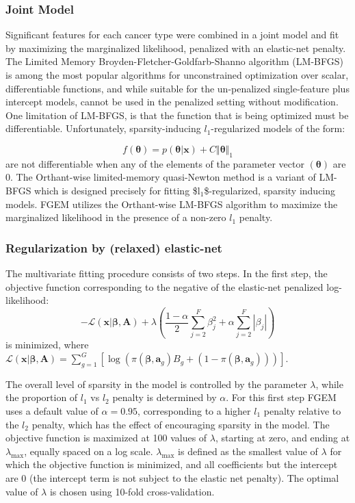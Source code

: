 \subsubsection{Joint Model}\label{sec:orga62a234}

Significant features for each cancer type were combined in a joint model and fit by maximizing the marginalized likelihood, penalized with an elastic-net penalty.  The Limited Memory Broyden-Fletcher-Goldfarb-Shanno algorithm (LM-BFGS) \cite{LMBFGS} is among the most popular algorithms
for unconstrained optimization over scalar, differentiable functions, and while suitable for the un-penalized single-feature plus intercept models, cannot be used in the penalized setting without modification.  One limitation of LM-BFGS, is that the function that is being optimized must be differentiable.  Unfortunately, sparsity-inducing $l_{\text{1}}$-regularized models of the form:

$$f(\boldsymbol{\theta})=p(\boldsymbol{\theta} | \textbf{x}) + C \Vert \boldsymbol{\theta} \Vert_1$$ are not differentiable when any of the elements of the parameter vector $(\boldsymbol{\theta})$ are 0.  The Orthant-wise limited-memory quasi-Newton method is a variant of LM-BFGS which is designed precisely for fitting \$l\(_{\text{1}}\)\$-regularized, sparsity inducing models.  FGEM utilizes the Orthant-wise LM-BFGS algorithm to maximize the marginalized likelihood in the presence of a non-zero $l_{\text{1}}$ penalty.
 
\subsubsection{Regularization by (relaxed) elastic-net}\label{sec:orge3a8031}

The multivariate fitting procedure consists of two steps.  In the first step, the objective function corresponding to the negative of the elastic-net penalized log-likelihood:
$$ -\mathcal{L}(\textbf{x}|\boldsymbol{\beta},\textbf{A}) + \lambda\left( \frac{1-\alpha}{2} \sum_{j=2}^F\beta_j^2 + \alpha \sum_{j=2}^F|\beta_j| \right) $$
is minimized, where \(\mathcal{L}(\textbf{x}|\boldsymbol{\beta},\textbf{A}) = \sum_{g=1}^{G}[\log\left(\pi(\boldsymbol{\beta},\textbf{a}_g)B_g+(1-\pi(\boldsymbol{\beta},\textbf{a}_g))\right)]\).
 

The overall level of sparsity in the model is controlled by the parameter \(\lambda\), while the proportion of \(l_1\) vs \(l_2\) penalty is determined by \(\alpha\).  For this first step FGEM uses a default value of $\alpha=0.95$, corresponding to a higher $l_{\text{1}}$ penalty relative to the $l_{\text{2}}$ penalty, which has the effect of encouraging sparsity in the model. The objective function is maximized at 100 values of \(\lambda\), starting at zero, and ending at \(\lambda_{\text{max}}\), equally spaced on a log scale.  \(\lambda_{\text{max}}\) is defined as the smallest value of \(\lambda\) for which the objective function is minimized, and all coefficients but the intercept are 0 (the intercept term is not subject to the elastic net penalty). The optimal value of \(\lambda\) is chosen using 10-fold cross-validation.  

